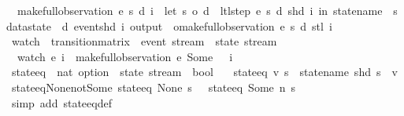 \begin{isabellebody}
\ \ {\isachardoublequoteopen}make{\isacharunderscore}full{\isacharunderscore}observation\ e\ s\ d\ i\ {\isacharequal}\ {\isacharparenleft}let\ {\isacharparenleft}s{\isacharprime}{\isacharcomma}\ o{\isacharprime}{\isacharcomma}\ d{\isacharprime}{\isacharparenright}\ {\isacharequal}\ ltl{\isacharunderscore}step\ e\ s\ d\ {\isacharparenleft}shd\ i{\isacharparenright}\ in\ {\isasymlparr}statename\ {\isacharequal}\ s{\isacharcomma}\ datastate\ {\isacharequal}\ d{\isacharcomma}\ event{\isacharequal}{\isacharparenleft}shd\ i{\isacharparenright}{\isacharcomma}\ output\ {\isacharequal}\ o{\isacharprime}{\isasymrparr}{\isacharhash}{\isacharhash}{\isacharparenleft}make{\isacharunderscore}full{\isacharunderscore}observation\ e\ s{\isacharprime}\ d{\isacharprime}\ {\isacharparenleft}stl\ i{\isacharparenright}{\isacharparenright}{\isacharparenright}{\isachardoublequoteclose}\isanewline
\isanewline
{}\isamarkupfalse%
\ watch\ {\isacharcolon}{\isacharcolon}\ {\isachardoublequoteopen}transition{\isacharunderscore}matrix\ {\isasymRightarrow}\ event\ stream\ {\isasymRightarrow}\ state\ stream{\isachardoublequoteclose}\ \isanewline
\ \ {\isachardoublequoteopen}watch\ e\ i\ {\isasymequiv}\ {\isacharparenleft}make{\isacharunderscore}full{\isacharunderscore}observation\ e\ {\isacharparenleft}Some\ {}{\isacharparenright}\ {\isacharless}{\isachargreater}\ i{\isacharparenright}{\isachardoublequoteclose}\isanewline
\isanewline
{}\isamarkupfalse%
\ state{\isacharunderscore}eq\ {\isacharcolon}{\isacharcolon}\ {\isachardoublequoteopen}nat\ option\ {\isasymRightarrow}\ state\ stream\ {\isasymRightarrow}\ bool{\isachardoublequoteclose}\ \isanewline
\ \ {\isachardoublequoteopen}state{\isacharunderscore}eq\ v\ s\ {\isasymequiv}\ statename\ {\isacharparenleft}shd\ s{\isacharparenright}\ {\isacharequal}\ v{\isachardoublequoteclose}\isanewline
\isanewline
{}\isamarkupfalse%
\ state{\isacharunderscore}eq{\isacharunderscore}None{\isacharunderscore}not{\isacharunderscore}Some{\isacharcolon}\ {\isachardoublequoteopen}state{\isacharunderscore}eq\ None\ s\ {\isasymLongrightarrow}\ {\isasymnot}\ state{\isacharunderscore}eq\ {\isacharparenleft}Some\ n{\isacharparenright}\ s{\isachardoublequoteclose}\isanewline
%
\isadelimproof
\ \ %
\endisadelimproof
%
\isatagproof
{}\isamarkupfalse%
\ {\isacharparenleft}simp\ add{\isacharcolon}\ state{\isacharunderscore}eq{\isacharunderscore}def{\isacharparenright}%
\endisatagproof
{\isafoldproof}%
%
\isadelimproof
\isanewline
%
\endisadelimproof

\end{isabellebody}
